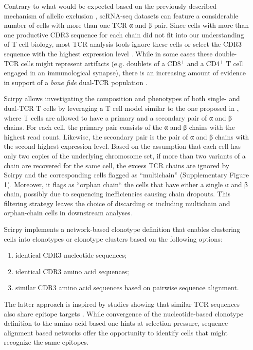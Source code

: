 \documentclass{article}
\begin{document}
Contrary to what would be expected based on the previously described mechanism of allelic exclusion \cite{Brady2010-gh}, scRNA-seq datasets can feature a considerable number of cells with more than one TCR α and β pair. Since cells with more than one productive CDR3 sequence for each chain did not fit into our understanding of T cell biology, most TCR analysis tools ignore these cells \cite{Fischer_undated-cx, Zhang2018-ip} or select the CDR3 sequence with the highest expression level \cite{Afik2017-sg}. While in some cases these double-TCR cells might represent artifacts (e.g. doublets of a CD8$^+$ and a CD4$^+$ T cell engaged in an immunological synapse), there is an increasing amount of evidence in support of a \textit{bone fide} dual-TCR population \cite{Schuldt2019-ey, Ji2010-bn}. \par

Scirpy allows investigating the composition and phenotypes of both single- and dual-TCR T cells by leveraging a T cell model similar to the one proposed in \cite{Stubbington2016-kh}, where T cells are allowed to have a primary and a secondary pair of α and β chains. For each cell, the primary pair consists of the α and β chains with the highest read count. Likewise, the secondary pair is the pair of α and β chains with the second highest expression level. Based on the assumption that each cell has only two copies of the underlying chromosome set, if more than two variants of a chain are recovered for the same cell, the excess TCR chains are ignored by Scirpy and the corresponding cells flagged as “multichain” (Supplementary Figure 1).  Moreover, it flags as “orphan chain“ the cells that have either a single α and β chain, possibly due to sequencing inefficiencies causing chain dropouts. This filtering strategy leaves the choice of discarding or including multichain and orphan-chain cells in downstream analyses.\par

Scirpy implements a network-based clonotype definition that enables clustering cells into clonotypes or clonotype clusters based on the following options:
\begin{enumerate}[label=(\alph*)]
    \item identical CDR3 nucleotide sequences;
    \item identical CDR3 amino acid sequences;
    \item similar CDR3 amino acid sequences based on pairwise sequence alignment. 
\end{enumerate}

The latter approach is inspired by studies showing that similar TCR sequences also share epitope targets \cite{Glanville2017-ay, Dash2017-xt, Fischer_undated-cx}. While convergence of the nucleotide-based clonotype definition to the amino acid based one hints at selection pressure, sequence alignment based networks offer the opportunity to identify cells that might recognize the same epitopes.\par

\newpage

\printbibliography[title={Supplementary References}]
\end{document}
